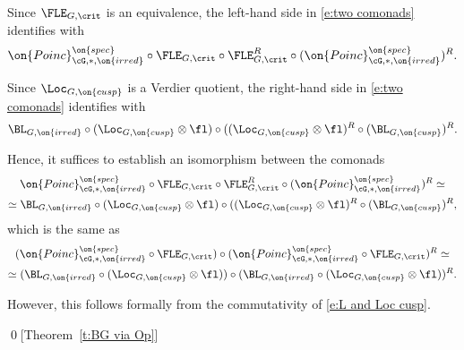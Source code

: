 \documentclass[9pt]{amsart}
\theoremstyle{remark}
\theoremstyle{definition}
\theoremstyle{remark}
\newcommand{\thmref}[1]{Theorem~\ref{#1}}
\numberwithin{equation}{section}
\begin{document}
\sssec{}

Since $\FLE_{G,\crit}$ is an equivalence, the left-hand side in \eqref{e:two comonads}
identifies with 
$$\on{Poinc}^{\on{spec}}_{\cG,*,\on{irred}} \circ \FLE_{G,\crit} \circ \FLE_{G,\crit}^R \circ (\on{Poinc}^{\on{spec}}_{\cG,*,\on{irred}})^R.$$

Since $\Loc_{G,\on{cusp}}$ is a Verdier quotient, the right-hand side in \eqref{e:two comonads} identifies with
$$\BL_{G,\on{irred}}\circ (\Loc_{G,\on{cusp}}\otimes \fl) \circ ((\Loc_{G,\on{cusp}} \otimes \fl)^R \circ (\BL_{G,\on{cusp}})^R.$$

\sssec{}

Hence, it suffices to establish an isomorphism between the comonads 
\begin{multline*}
\on{Poinc}^{\on{spec}}_{\cG,*,\on{irred}} \circ \FLE_{G,\crit} \circ \FLE_{G,\crit}^R \circ (\on{Poinc}^{\on{spec}}_{\cG,*,\on{irred}})^R\simeq \\
\simeq \BL_{G,\on{irred}}\circ (\Loc_{G,\on{cusp}}\otimes \fl) \circ ((\Loc_{G,\on{cusp}} \otimes \fl)^R \circ (\BL_{G,\on{cusp}})^R,
\end{multline*}
which is the same as
\begin{multline*}
(\on{Poinc}^{\on{spec}}_{\cG,*,\on{irred}} \circ \FLE_{G,\crit})\circ 
(\on{Poinc}^{\on{spec}}_{\cG,*,\on{irred}} \circ \FLE_{G,\crit})^R \simeq \\
\simeq (\BL_{G,\on{irred}}\circ (\Loc_{G,\on{cusp}}\otimes \fl))\circ (\BL_{G,\on{irred}}\circ (\Loc_{G,\on{cusp}}\otimes \fl))^R.
\end{multline*}

However, this follows formally from the commutativity of \eqref{e:L and Loc cusp}. 

\qed[\thmref{t:BG via Op}]
\end{document}
